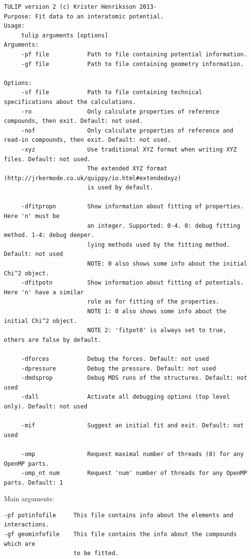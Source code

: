 \documentclass[a4paper,12pt,pdftex,onecolumn]{article}
\begin{document}
\begin{Verbatim}[fontsize=\relsize{-3},frame=single]
TULIP version 2 (c) Krister Henriksson 2013-
Purpose: Fit data to an interatomic potential.
Usage:
     tulip arguments [options]
Arguments:
     -pf file           Path to file containing potential information.
     -gf file           Path to file containing geometry information.

Options:
     -sf file           Path to file containing technical specifications about the calculations.
     -ro                Only calculate properties of reference compounds, then exit. Default: not used.
     -nof               Only calculate properties of reference and read-in compounds, then exit. Default: not used.
     -xyz               Use traditional XYZ format when writing XYZ files. Default: not used.
                        The extended XYZ format (http://jrkermode.co.uk/quippy/io.html#extendedxyz)
                        is used by default.

     -dfitpropn         Show information about fitting of properties. Here 'n' must be
                        an integer. Supported: 0-4. 0: debug fitting method. 1-4: debug deeper.
                        lying methods used by the fitting method. Default: not used
                        NOTE: 0 also shows some info about the initial Chi^2 object.
     -dfitpotn          Show information about fitting of potentials. Here 'n' have a similar
                        role as for fitting of the properties.
                        NOTE 1: 0 also shows some info about the initial Chi^2 object.
                        NOTE 2: 'fitpot0' is always set to true, others are false by default.

     -dforces           Debug the forces. Default: not used
     -dpressure         Debug the pressure. Default: not used
     -dmdsprop          Debug MDS runs of the structures. Default: not used
     -dall              Activate all debugging options (top level only). Default: not used

     -mif               Suggest an initial fit and exit. Default: not used

     -omp               Request maximal number of threads (8) for any OpenMP parts.
     -omp_nt num        Request 'num' number of threads for any OpenMP parts. Default: 1
\end{Verbatim}


Main arguments:

\begin{Verbatim}[fontsize=\relsize{-1},frame=single]
-pf potinfofile     This file contains info about the elements and interactions.
-gf geominfofile    This file contains the info about the compounds which are
                    to be fitted.
\end{Verbatim}
\end{document}

